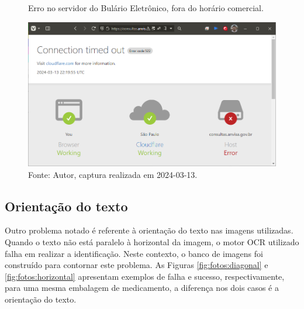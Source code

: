 \begin{figure}[htbp]
    \centering
    \caption{Erro no servidor do Bulário Eletrônico, fora do horário comercial.}
    \includegraphics[width=0.95\linewidth]{../pictures/Anvisa_error_timeout.png}
    \caption*{Fonte: Autor, captura realizada em 2024-03-13.}
    \label{fig:fail:timeout}
\end{figure}

\subsection{Orientação do texto}

Outro problema notado é referente à orientação do texto nas imagens utilizadas.
Quando o texto não está paralelo à horizontal da imagem, o motor \ac{OCR} utilizado falha em realizar a identificação.
Neste contexto, o banco de imagens foi construído para contornar este problema.
As Figuras \ref{fig:fotos:diagonal} e \ref{fig:fotos:horizontal} apresentam exemplos de falha e sucesso, respectivamente, para uma mesma embalagem de medicamento, a diferença nos dois casos é a orientação do texto.


